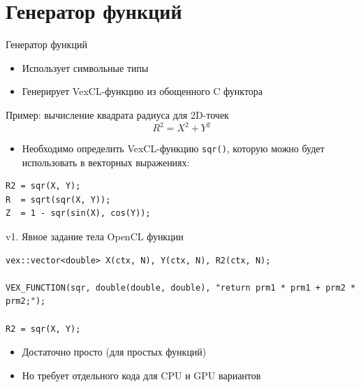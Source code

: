 \documentclass[@BEAMER_OPTIONS@]{beamer}
\newcommand{\code}[1]{\lstinline|#1|}
\newcommand{\Cpp}{{C\nolinebreak[4]\hspace{-.05em}\raisebox{.4ex}{\tiny\bf ++}}\xspace}
\begin{document}
\section{Генератор функций}

\begin{frame}{}
    \tableofcontents[currentsection]
\end{frame}

\note{}

\begin{frame}[fragile]{Генератор функций}
    \begin{itemize}
        \item Использует символьные типы
        \item Генерирует VexCL-функцию из обощенного \Cpp функтора
    \end{itemize}

    \begin{exampleblock}{Пример: вычисление квадрата радиуса для 2D-точек}
        \begin{equation*}
            R^2 = X^2 + Y^2
        \end{equation*}
    \end{exampleblock}

    \begin{itemize}
        \item Необходимо определить VexCL-функцию \code{sqr()}, которую можно
            будет использовать в векторных выражениях:
    \end{itemize}
    \begin{exampleblock}{}
        \begin{lstlisting}
R2 = sqr(X, Y);
R  = sqrt(sqr(X, Y));
Z  = 1 - sqr(sin(X), cos(Y));
        \end{lstlisting}
    \end{exampleblock}
\end{frame}

\note{ }

\begin{frame}[fragile]{v1. Явное задание тела OpenCL функции}
    \begin{exampleblock}{}
        \begin{lstlisting}
vex::vector<double> X(ctx, N), Y(ctx, N), R2(ctx, N);

VEX_FUNCTION(sqr, double(double, double), "return prm1 * prm1 + prm2 * prm2;");

R2 = sqr(X, Y);
        \end{lstlisting}
    \end{exampleblock}

    \begin{itemize}
        \item Достаточно просто (для простых функций)
        \item Но требует отдельного кода для CPU и GPU вариантов
    \end{itemize}
\end{frame}
\end{document}
